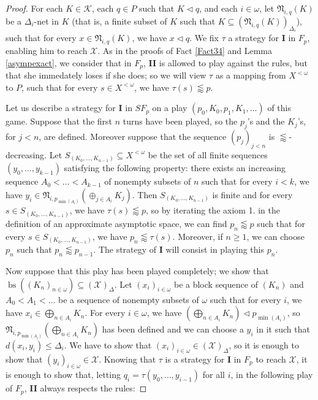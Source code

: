 \documentclass[a4paper,11pt]{article}
\theoremstyle{definition}
\numberwithin{equation}{section}
\newcommand{\X}{\mathcal{X}}
\newcommand{\I}{\textbf{I}}
\newcommand{\II}{\textbf{II}}
\newcommand{\K}{\mathcal{K}}
\DeclareMathOperator{\bs}{bs}
\begin{document}
\begin{proof}

For each $K \in \K$, each $q \in P$ such that $K \vartriangleleft q$, and each $i \in \omega$, let $\mathfrak{N}_{i, q}(K)$ be a $\Delta_i$-net in $K$ (that is, a finite subset of $K$ such that $K \subseteq (\mathfrak{N}_{i, q}(K))_{\Delta_i}$), such that for every $x \in \mathfrak{N}_{i, q}(K)$, we have $x \vartriangleleft q$. We fix $\tau$ a strategy for \I{} in $F_p$, enabling him to reach $\X$. As in the proofs of Fact \ref{Fact34} and Lemma \ref{asympexact}, we consider that in $F_p$, \II{} is allowed to play against the rules, but that she immedately loses if she does; so we will view $\tau$ as a mapping from $X^{< \omega}$ to $P$, such that for every $s \in X^{< \omega}$, we have $\tau(s) \lessapprox p$.

\smallskip

Let us describe a strategy for \I{} in $SF_p$ on a play $(p_0, K_0, p_1, K_1, \ldots)$ of this game. Suppose that the first $n$ turns have been played, so the $p_j$'s and the $K_j$'s, for $j < n$, are defined. Moreover suppose that the sequence $(p_j)_{j < n}$ is $\lessapprox$-decreasing. Let $S_{(K_0, \ldots, K_{n - 1})} \subseteq X^{< \omega}$ be the set of all finite sequences $(y_0, \ldots, y_{k - 1})$ satisfying the following property: there exists an increasing sequence $A_0 < \ldots < A_{k - 1}$ of nonempty subsets of $n$ such that for every $i < k$, we have $y_i \in \mathfrak{N}_{i, p_{\min(A_i)}}(\oplus_{j \in A_i} K_j)$. Then $S_{(K_0, \ldots, K_{n - 1})}$ is finite and for every $s \in S_{(K_0, \ldots, K_{n - 1})}$, we have $\tau(s) \lessapprox p$, so by iterating the axiom 1. in the definition of an approximate asymptotic space, we can find $p_n \lessapprox p$ such that for every $s \in S_{(K_0, \ldots, K_{n - 1})}$, we have $p_n \lessapprox \tau(s)$. Moreover, if $n \geqslant 1$, we can choose $p_n$ such that $p_n \lessapprox p_{n - 1}$. The strategy of \I{} will consist in playing this $p_n$.

\smallskip

Now suppose that this play has been played completely; we show that $\bs((K_n)_{n \in \omega}) \subseteq (\X)_\Delta$. Let $(x_i)_{i \in \omega}$ be a block sequence of $(K_n)$ and $A_0 < A_1 < \ldots$ be a sequence of nonempty subsets of $\omega$ such that for every $i$, we have $x_i \in \bigoplus_{n \in A_i} K_n$. For every $i \in \omega$, we have $\left(\bigoplus_{n \in A_i} K_n\right) \vartriangleleft p_{\min(A_i)}$, so $\mathfrak{N}_{i, p_{\min(A_i)}}\left(\bigoplus_{n \in A_i} K_n\right)$ has been defined and we can choose a $y_i$ in it such that $d(x_i, y_i) \leqslant \Delta_i$. We have to show that $(x_i)_{i \in \omega} \in (\X)_\Delta$, so it is enough to show that $(y_i)_{i \in \omega} \in \X$. Knowing that $\tau$ is a strategy for \I{} in $F_p$ to reach $\X$, it is enough to show that, letting $q_i = \tau(y_0, \ldots, y_{i - 1})$ for all $i$, in the following play of $F_p$, \II{} always respects the rules:


\end{proof}
\end{document}
